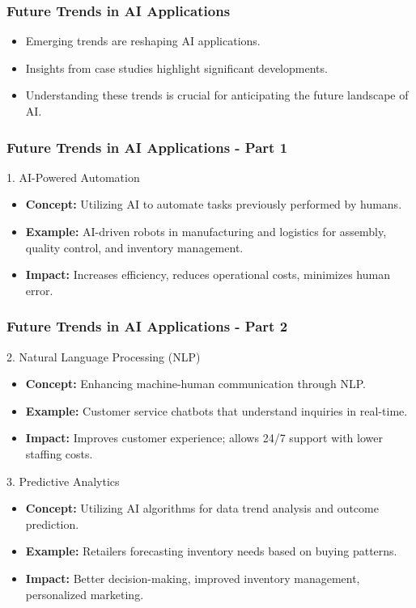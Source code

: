 \documentclass{beamer}
\begin{document}
\begin{frame}[fragile]
    \frametitle{Future Trends in AI Applications}
    \begin{itemize}
        \item Emerging trends are reshaping AI applications.
        \item Insights from case studies highlight significant developments.
        \item Understanding these trends is crucial for anticipating the future landscape of AI.
    \end{itemize}
\end{frame}

\begin{frame}[fragile]
    \frametitle{Future Trends in AI Applications - Part 1}
    \begin{block}{1. AI-Powered Automation}
        \begin{itemize}
            \item \textbf{Concept:} Utilizing AI to automate tasks previously performed by humans.
            \item \textbf{Example:} AI-driven robots in manufacturing and logistics for assembly, quality control, and inventory management.
            \item \textbf{Impact:} Increases efficiency, reduces operational costs, minimizes human error.
        \end{itemize}
    \end{block}
\end{frame}

\begin{frame}[fragile]
    \frametitle{Future Trends in AI Applications - Part 2}
    \begin{block}{2. Natural Language Processing (NLP)}
        \begin{itemize}
            \item \textbf{Concept:} Enhancing machine-human communication through NLP.
            \item \textbf{Example:} Customer service chatbots that understand inquiries in real-time.
            \item \textbf{Impact:} Improves customer experience; allows 24/7 support with lower staffing costs.
        \end{itemize}
    \end{block}

    \begin{block}{3. Predictive Analytics}
        \begin{itemize}
            \item \textbf{Concept:} Utilizing AI algorithms for data trend analysis and outcome prediction.
            \item \textbf{Example:} Retailers forecasting inventory needs based on buying patterns.
            \item \textbf{Impact:} Better decision-making, improved inventory management, personalized marketing.
        \end{itemize}
    \end{block}
\end{frame}
\end{document}
